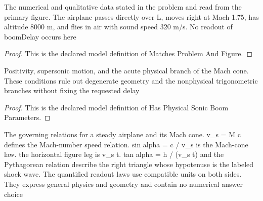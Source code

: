 \begin{definition}
  \label{def:physics:phyx-mini-0198:phyxminiproblems-problemphyxmini0198-matchesproblemandfigure}
  The numerical and qualitative data stated in the problem and read from the primary figure. The airplane passes directly over L, moves right at Mach 1.75, has altitude 8000 m, and flies in air with sound speed 320 m/s. No readout of boomDelay occurs here
\end{definition}
\begin{proof}
  This is the declared model definition of Matches Problem And Figure.
\end{proof}
\begin{definition}
  \label{def:physics:phyx-mini-0198:phyxminiproblems-problemphyxmini0198-hasphysicalsonicboomparameters}
  Positivity, supersonic motion, and the acute physical branch of the Mach cone. These conditions rule out degenerate geometry and the nonphysical trigonometric branches without fixing the requested delay
\end{definition}
\begin{proof}
  This is the declared model definition of Has Physical Sonic Boom Parameters.
\end{proof}
\begin{definition}
  \label{def:physics:phyx-mini-0198:phyxminiproblems-problemphyxmini0198-satisfiesmachconeandflightlaws}
  The governing relations for a steady airplane and its Mach cone. v\_s = M c defines the Mach-number speed relation. sin alpha = c / v\_s is the Mach-cone law. the horizontal figure leg is v\_s t. tan alpha = h / (v\_s t) and the Pythagorean relation describe the right triangle whose hypotenuse is the labeled shock wave. The quantified readout laws use compatible units on both sides. They express general physics and geometry and contain no numerical answer choice
\end{definition}
